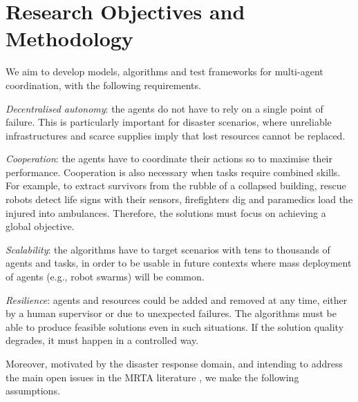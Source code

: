 \section{Research Objectives and Methodology}\label{sec:objectives}

We aim to develop models, algorithms and test frameworks for multi-agent coordination,
with the following requirements.
\begin{description}[style=nextline]
    \item[R1] \emph{Decentralised autonomy}: the agents do not have to rely on a single
        point of failure. This is particularly important for disaster scenarios, where
        unreliable infrastructures and scarce supplies imply that lost resources cannot
        be replaced.
    \item[R2] \emph{Cooperation}: the agents have to coordinate their actions so to
        maximise their performance. Cooperation is also necessary when tasks require
        combined skills. For example, to extract survivors from the rubble of a collapsed
        building, rescue robots detect life signs with their sensors, firefighters dig and
        paramedics load the injured into ambulances.
        Therefore, the solutions must focus on achieving a global objective.
    \item[R3] \emph{Scalability}: the algorithms have to target scenarios with tens to
        thousands of agents and tasks, in order to be usable in future contexts where
        mass deployment of agents (e.g., robot swarms) will be common.
    \item[R4] \emph{Resilience}: agents and resources could be added and removed at any
        time, either by a human supervisor or due to unexpected failures. The algorithms
        must be able to produce feasible solutions even in such situations. If the
        solution quality degrades, it must happen in a controlled way.
\end{description}
Moreover, motivated by the disaster response domain, and intending to address the main
open issues in the MRTA literature \cite[Section $9.2$]{nunes2017taxonomy}, we make the
following assumptions.
